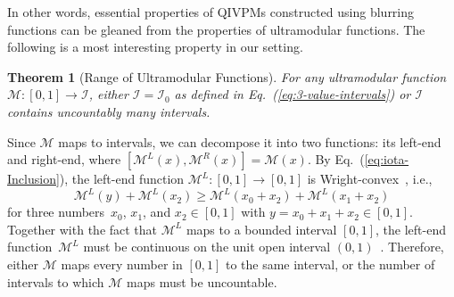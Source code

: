 \documentclass[english,reprint, aps, prl,superscriptaddress, showpacs,
showkeys, longbibliography, amsmath, amssymb, floatfix]{revtex4-1}
\theoremstyle{plain}
\newtheorem{thm}{Theorem}
\theoremstyle{definition}
\newcommand{\ultramodular}{\mathcal{M}}
\newcommand{\ultramodularL}[1][]{\ensuremath{\ultramodular^{L{#1}}}}
\newcommand{\ultramodularR}[1][]{\ensuremath{\ultramodular^{R{#1}}}}
\newcommand{\muB}{\ensuremath{\mu^{B}}}
\begin{document}

In other words, essential properties of QIVPMs constructed using
blurring functions can be gleaned from the properties of
ultramodular functions. The following is a most interesting property
in our setting. 

\begin{thm}[Range of Ultramodular Functions]\label{thm:convex-uncountable}For
any ultramodular function~$\ultramodular:\left[0,1\right]\rightarrow\mathscr{I}$,
either $\mathscr{I}=\mathscr{I}_{0}$ as defined in Eq.~(\ref{eq:3-value-intervals}) or
$\mathscr{I}$ contains uncountably many intervals.\end{thm}

Since $\ultramodular$ maps to intervals, we can decompose it into
two functions: its left-end and right-end, where
 $\left[\ultramodularL\left(x\right),\ultramodularR\left(x\right)\right]=\ultramodular\left(x\right)$.
By Eq.~(\ref{eq:iota-Inclusion}), the left-end function $\ultramodularL:\left[0,1\right]\rightarrow\left[0,1\right]$
is Wright-convex~\cite{Wright1954,RobertsVarberg1973,PecaricTong1992},
i.e., 
\[
\ultramodularL\left(y\right)+\ultramodularL\left(x_{2}\right)\ge\ultramodularL\left(x_{0}+x_{2}\right)+\ultramodularL\left(x_{1}+x_{2}\right)
\]
for three numbers~$x_{0}$, $x_{1}$, and $x_{2}\in\left[0,1\right]$ with
$y=x_{0}+x_{1}+x_{2}\in\left[0,1\right]$. 
Together with the fact that $\ultramodularL$ maps to a bounded
interval $\left[0,1\right]$, the left-end function~$\ultramodularL$
must be continuous on the unit open interval
$\left(0,1\right)$~\cite{MarinacciMontrucchio2005}.  Therefore,
either $\ultramodular$ maps every number in $\left[0,1\right]$ to the
same interval, or the number of intervals to which $\ultramodular$ maps
must be uncountable.
\end{document}
